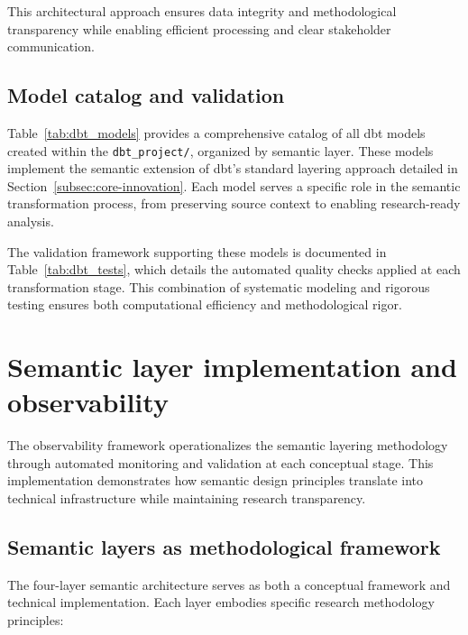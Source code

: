 \documentclass{article}
\begin{document}
This architectural approach ensures data integrity and methodological transparency while enabling efficient processing and clear stakeholder communication.

\subsection{Model catalog and validation}

Table~\ref{tab:dbt_models} provides a comprehensive catalog of all dbt models created within the \texttt{dbt\_project/}, organized by semantic layer. These models implement the semantic extension of dbt's standard layering approach detailed in Section~\ref{subsec:core-innovation}. Each model serves a specific role in the semantic transformation process, from preserving source context to enabling research-ready analysis.

The validation framework supporting these models is documented in Table~\ref{tab:dbt_tests}, which details the automated quality checks applied at each transformation stage. This combination of systematic modeling and rigorous testing ensures both computational efficiency and methodological rigor.



\section{Semantic layer implementation and observability}
\label{sec:semantic-implementation}

The observability framework operationalizes the semantic layering methodology through automated monitoring and validation at each conceptual stage. This implementation demonstrates how semantic design principles translate into technical infrastructure while maintaining research transparency.

\subsection{Semantic layers as methodological framework}
\label{subsec:semantic-layers}

The four-layer semantic architecture serves as both a conceptual framework and technical implementation. Each layer embodies specific research methodology principles:
\end{document}
